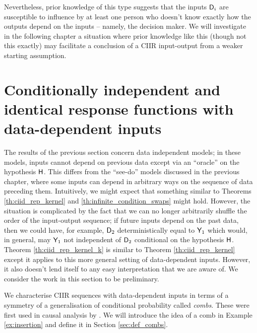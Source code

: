 Nevertheless, prior knowledge of this type suggests that the inputs $\mathsf{D}_i$ are susceptible to influence by at least one person who doesn't know exactly how the outputs depend on the inputs -- namely, the decision maker. We will investigate in the following chapter a situation where prior knowledge like this (though not this exactly) may facilitate a conclusion of a CIIR input-output from a weaker starting assumption.

\section[Data-dependent inputs]{Conditionally independent and identical response functions with data-dependent inputs}\label{sec:data_dependent}

The results of the previous section concern data independent models; in these models, inputs cannot depend on previous data except via an ``oracle'' on the hypothesis $\mathsf{H}$. This differs from the ``see-do'' models discussed in the previous chapter, where some inputs can depend in arbitrary ways on the sequence of data preceding them. Intuitively, we might expect that something similar to Theorems \ref{th:ciid_rep_kernel} and \ref{th:infinite_condition_swaps} might hold. However, the situation is complicated by the fact that we can no longer arbitrarily shuffle the order of the input-output sequence; if future inputs depend on the past data, then we could have, for example, $\mathsf{D}_2$ deterministically equal to $\mathsf{Y}_1$ which would, in general, may $\mathsf{Y}_1$ not independent of $\mathsf{D}_2$ conditional on the hypothesis $\mathsf{H}$. Theorem \ref{th:ciid_rep_kernel_k} is similar to Theorem \ref{th:ciid_rep_kernel} except it applies to this more general setting of data-dependent inputs. However, it also doesn't lend itself to any easy interpretation that we are aware of. We consider the work in this section to be preliminary.

We characterise CIIR sequences with data-dependent inputs in terms of a symmetry of a generalisation of conditional probability called \emph{combs}. These were first used in causal analysis by \citet{jacobs_causal_2019}. We will introduce the idea of a comb in Example \ref{ex:insertion} and define it in Section \ref{sec:def_combs}.

